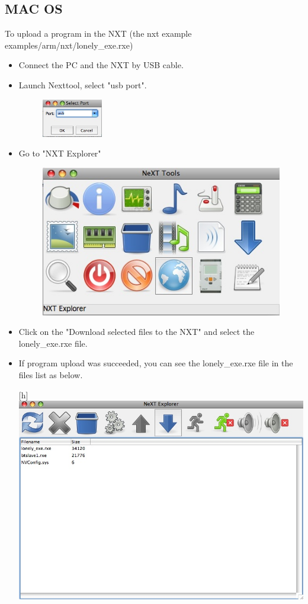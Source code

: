 \documentclass[10pt]{article}
\begin{document}
\subsection{MAC OS}
To upload a program in the NXT (the nxt example examples/arm/nxt/lonely\_exe.rxe)
\begin{itemize}
\item Connect the PC and the NXT by USB cable.
\item Launch Nexttool, select "usb port".
	\begin{figure}[htbp] %
   		\centering
		\includegraphics[width=0.25\textwidth]{pictures/usb_port.jpg}
	\end{figure}
\item Go to "NXT Explorer"
	\begin{figure}[htbp] %
   		\centering
		\includegraphics[width=.7\textwidth]{pictures/nxt_explorer.jpg}
	\end{figure}
\item Click on the "Download selected files to the NXT" and select the lonely\_exe.rxe file.
\item If program upload was succeeded, you can see the lonely\_exe.rxe file in the files list as below.
	\begin{center}[h] %
		\includegraphics[width=1\textwidth]{pictures/download_file.jpg}

\end{center}
\end{itemize}
\end{document}
